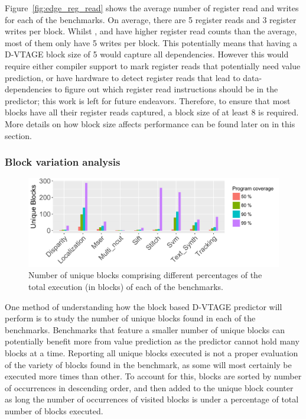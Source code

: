 Figure~\ref{fig:edge_reg_read} shows the average number of register read and writes for each of the benchmarks.
On average, there are 5 register reads and 3 register writes per block.
Whilst  ,  and  have higher register read counts than the average, most of them only have 5 writes per block.
This potentially means that having a D-VTAGE block size of 5 would capture all dependencies.
However this would require either compiler support to mark register reads that potentially need value prediction, or have hardware to detect register reads that lead to data-dependencies to figure out which register read instructions should be in the predictor; this work is left for future endeavors.
Therefore, to ensure that most blocks have all their register reads captured, a block size of at least 8 is required.
More details on how block size affects performance can be found later on in this section.

\subsubsection{Block variation analysis}

\begin{figure}[t]
    \centering
    \includegraphics[width=1\textwidth]{chapter3/graphics/unique_blocks.pdf}

    \caption{Number of unique blocks comprising different percentages of the total execution (in blocks) of each of the benchmarks.}
    \label{fig:totblock}
	\vspace{1em}
\end{figure}

One method of understanding how the block based D-VTAGE predictor will perform is to study the number of unique blocks found in each of the benchmarks.
Benchmarks that feature a smaller number of unique blocks can potentially benefit more from value prediction as the predictor cannot hold many blocks at a time.
Reporting all unique blocks executed is not a proper evaluation of the variety of blocks found in the benchmark, as some will most certainly be executed more times than other.
To account for this, blocks are sorted by number of occurrences in descending order, and then added to the unique block counter as long the number of occurrences of visited blocks is under a percentage of total number of blocks executed.

